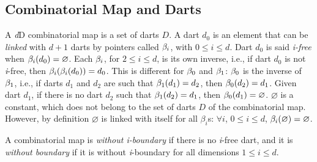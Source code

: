 \subsection{Combinatorial Map and Darts}\label{ssec-combi-map-and-darts}
A \emph{d}D combinatorial map is a set of darts $D$. A dart $d_0$ is an
element that can be \emph{linked} with $d+1$ darts by pointers called
$\beta_{i}$, with $0 \leq i \leq d$.  Dart $d_0$ is said \emph{i-free}
when $\beta_{i}(d_0)=\varnothing$.  Each $\beta_{i}$, for $2 \leq i \leq d$,
is its own inverse, i.e., if dart $d_0$ is not \emph{i}-free, then
$\beta_{i}(\beta_{i}(d_0))=d_0$.  This is different for $\beta_{0}$ and
$\beta_{1}$: $\beta_{0}$ is the inverse of $\beta_{1}$, i.e., if darts $d_1$
and $d_2$ are such that $\beta_{1}(d_1)=d_2$, then
$\beta_{0}(d_2)=d_1$. Given dart $d_1$, if there is no dart $d_2$ such
that $\beta_{1}(d_2)=d_1$, then $\beta_{0}(d_1)=\varnothing$.  $\varnothing$
is a constant, which does not belong to the set of darts $D$ of the
combinatorial map. However, by definition $\varnothing$ is linked with
itself for all $\beta_i$s: $\forall i$, $0 \leq i \leq d$,
$\beta_{i}(\varnothing)=\varnothing$.




A combinatorial map is \emph{without i-boundary} if there is no
\emph{i}-free dart, and it is \emph{without boundary} if it is without
\emph{i}-boundary for all dimensions $1 \leq i \leq d$.


